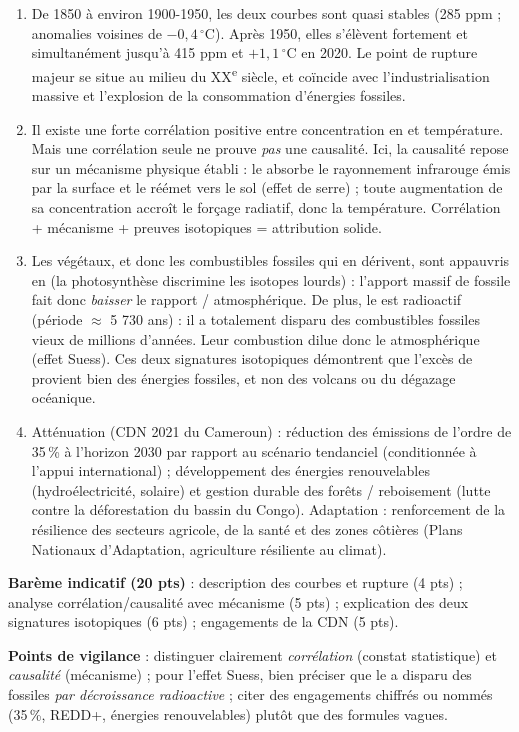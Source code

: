 \documentclass[11pt]{article}
\begin{document}
\begin{corrige}
\begin{enumerate}
    \item De 1850 à environ 1900-1950, les deux courbes sont quasi stables (285 ppm ; anomalies voisines de $-0{,}4\,^\circ$C). Après 1950, elles s'élèvent fortement et simultanément jusqu'à 415 ppm et $+1{,}1\,^\circ$C en 2020. Le point de rupture majeur se situe au milieu du XX\textsuperscript{e} siècle, et coïncide avec l'industrialisation massive et l'explosion de la consommation d'énergies fossiles.
    \item Il existe une forte corrélation positive entre concentration en  et température. Mais une corrélation seule ne prouve \emph{pas} une causalité. Ici, la causalité repose sur un mécanisme physique établi : le  absorbe le rayonnement infrarouge émis par la surface et le réémet vers le sol (effet de serre) ; toute augmentation de sa concentration accroît le forçage radiatif, donc la température. Corrélation + mécanisme + preuves isotopiques = attribution solide.
    \item Les végétaux, et donc les combustibles fossiles qui en dérivent, sont appauvris en  (la photosynthèse discrimine les isotopes lourds) : l'apport massif de  fossile fait donc \emph{baisser} le rapport / atmosphérique. De plus, le  est radioactif (période $\approx$ 5 730 ans) : il a totalement disparu des combustibles fossiles vieux de millions d'années. Leur combustion dilue donc le  atmosphérique (effet Suess). Ces deux signatures isotopiques démontrent que l'excès de  provient bien des énergies fossiles, et non des volcans ou du dégazage océanique.
    \item Atténuation (CDN 2021 du Cameroun) : réduction des émissions de l'ordre de 35\,\% à l'horizon 2030 par rapport au scénario tendanciel (conditionnée à l'appui international) ; développement des énergies renouvelables (hydroélectricité, solaire) et gestion durable des forêts / reboisement (lutte contre la déforestation du bassin du Congo). Adaptation : renforcement de la résilience des secteurs agricole, de la santé et des zones côtières (Plans Nationaux d'Adaptation, agriculture résiliente au climat).
\end{enumerate}
\textbf{Barème indicatif (20 pts)} : description des courbes et rupture (4 pts) ; analyse corrélation/causalité avec mécanisme (5 pts) ; explication des deux signatures isotopiques (6 pts) ; engagements de la CDN (5 pts).

\textbf{Points de vigilance} : distinguer clairement \emph{corrélation} (constat statistique) et \emph{causalité} (mécanisme) ; pour l'effet Suess, bien préciser que le  a disparu des fossiles \emph{par décroissance radioactive} ; citer des engagements chiffrés ou nommés (35\,\%, REDD+, énergies renouvelables) plutôt que des formules vagues.
\end{corrige}
\end{document}
